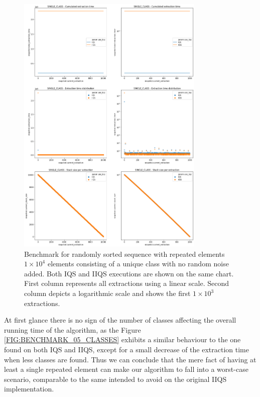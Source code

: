 \begin{figure}[!ht]
    \centering
    \includegraphics[width=0.8\textwidth]{./fragments/04_experimental_execution/images/01_basebenchmark_04_single_class.png}
    \caption{Benchmark for randomly sorted sequence with repeated elements $1\times10^4$ elements consisting of a unique class with no random noise added. Both IQS and IIQS executions are shown on the same chart. First column represents all extractions using a linear scale. Second column depicts a logarithmic scale and shows the first $1\times10^3$ extractions.}
    \label{FIG:BENCHMARK_04_SINGLE_CLASS}
\end{figure}

At first glance there is no sign of the number of classes affecting the overall running time of the algorithm, as the Figure \ref{FIG:BENCHMARK_05_CLASSES} exhibits a similar behaviour to the one found on both IQS and IIQS, except for a small decrease of the extraction time when less classes are found. Thus we can conclude that the mere fact of having at least a single repeated element can make our algorithm to fall into a worst-case scenario, comparable to the same intended to avoid on the original IIQS implementation.

\FloatBarrier